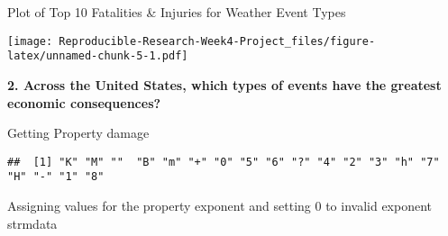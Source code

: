 \documentclass[
]{article}
\newenvironment{Shaded}{\begin{snugshade}}{\end{snugshade}}
\newcommand{\DataTypeTok}[1]{\textcolor[rgb]{0.13,0.29,0.53}{#1}}
\newcommand{\DecValTok}[1]{\textcolor[rgb]{0.00,0.00,0.81}{#1}}
\newcommand{\KeywordTok}[1]{\textcolor[rgb]{0.13,0.29,0.53}{\textbf{#1}}}
\newcommand{\NormalTok}[1]{#1}
\newcommand{\OperatorTok}[1]{\textcolor[rgb]{0.81,0.36,0.00}{\textbf{#1}}}
\newcommand{\StringTok}[1]{\textcolor[rgb]{0.31,0.60,0.02}{#1}}
\begin{document}
Plot of Top 10 Fatalities \& Injuries for Weather Event Types

\begin{Shaded}
\end{Shaded}

\texttt{[image: Reproducible-Research-Week4-Project\_files/figure-latex/unnamed-chunk-5-1.pdf]}

\textbf{2. Across the United States, which types of events have the
greatest economic consequences?}

Getting Property damage

\begin{Shaded}
\end{Shaded}

\begin{verbatim}
##  [1] "K" "M" ""  "B" "m" "+" "0" "5" "6" "?" "4" "2" "3" "h" "7" "H" "-" "1" "8"
\end{verbatim}

Assigning values for the property exponent and setting 0 to invalid
exponent strmdata
\end{document}
